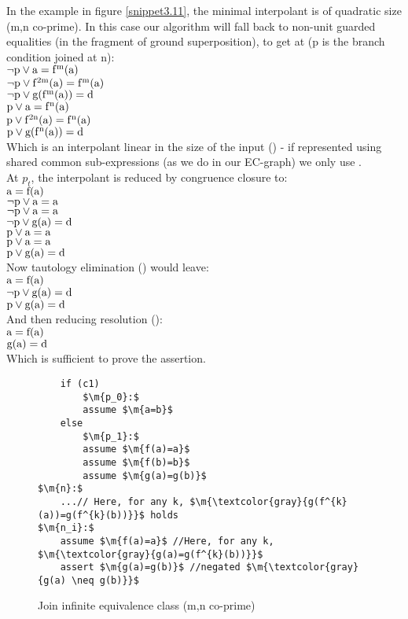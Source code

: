 In the example in figure \ref{snippet3.11}, the minimal interpolant is of quadratic size (m,n co-prime).
In this case our algorithm will fall back to non-unit guarded equalities (in the fragment of ground superposition), to get at  (p is the branch condition joined at n):\\
$\mathrm{\lnot p \lor a=f^m(a)}$\\
$\mathrm{\lnot p \lor f^{2m}(a)=f^m(a)}$\\
$\mathrm{\lnot p \lor g(f^{m}(a)) = d}$\\
$\mathrm{      p \lor a=f^n(a)}$\\
$\mathrm{      p \lor f^{2n}(a)=f^n(a)}$\\
$\mathrm{      p \lor g(f^{n}(a)) = d}$\\
Which is an interpolant linear in the size of the input () - if represented using shared common sub-expressions (as we do in our EC-graph) we only use .\\
At $p_t$, the interpolant is reduced by congruence closure to:\\
$\mathrm{a=f(a)}$\\
$\mathrm{\lnot p \lor a=a}$\\
$\mathrm{\lnot p \lor a=a}$\\
$\mathrm{\lnot p \lor g(a) = d}$\\
$\mathrm{      p \lor a=a}$\\
$\mathrm{      p \lor a=a}$\\
$\mathrm{      p \lor g(a)=d}$\\
Now tautology elimination () would leave:\\
$\mathrm{a=f(a)}$\\
$\mathrm{\lnot p \lor g(a)=d}$\\
$\mathrm{      p \lor g(a)=d}$\\
And then reducing resolution ():\\
$\mathrm{a=f(a)}$\\
$\mathrm{g(a)=d}$\\
Which is sufficient to prove the assertion.

\begin{figure}
\begin{lstlisting}
	if (c1)
		$\m{p_0}:$ 
		assume $\m{a=b}$
	else
		$\m{p_1}:$
		assume $\m{f(a)=a}$
		assume $\m{f(b)=b}$
		assume $\m{g(a)=g(b)}$
$\m{n}:$
	...// Here, for any k, $\m{\textcolor{gray}{g(f^{k}(a))=g(f^{k}(b))}}$ holds
$\m{n_i}:$
	assume $\m{f(a)=a}$ //Here, for any k, $\m{\textcolor{gray}{g(a)=g(f^{k}(b))}}$	
	assert $\m{g(a)=g(b)}$ //negated $\m{\textcolor{gray}{g(a) \neq g(b)}}$
\end{lstlisting}
\caption{Join infinite equivalence class (m,n co-prime)}
\label{snippet3.30}
\end{figure}

